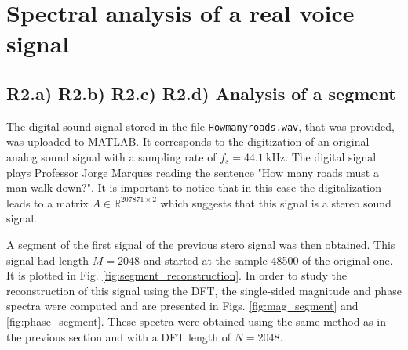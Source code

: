 \documentclass[a4paper, oneside, 11pt]{article}
\begin{document}
\section{Spectral analysis of a real voice signal}

\subsection{R2.a) R2.b) R2.c) R2.d) Analysis of a segment}

The digital sound signal stored in the file \texttt{Howmanyroads.wav}, that was provided, was uploaded to MATLAB\texttrademark. It corresponds to the digitization of an original analog sound signal with a sampling rate of $f_s = \SI{44.1}{\kilo \hertz}$. The digital signal plays Professor Jorge Marques reading the sentence "How many roads must a man walk down?". It is important to notice that in this case the digitalization leads to a matrix $A \in \mathbb{R}^{207871\times2}$ which suggests that this signal is a stereo sound signal.

A segment of the first signal of the previous stero signal was then obtained. This signal had length $M=2048$ and started at the sample 48500 of the original one. It is plotted in Fig. \ref{fig:segment_reconstruction}. In order to study the reconstruction of this signal using the DFT, the single-sided magnitude and phase spectra were computed and are presented in Figs. \ref{fig:mag_segment} and \ref{fig:phase_segment}. These spectra were obtained using the same method as in the previous section and with a DFT length of $N = 2048$.
\end{document}
